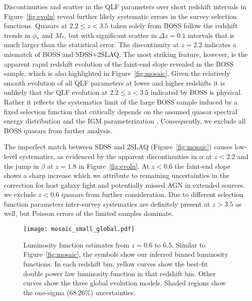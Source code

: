 \documentclass[fleqn,usenatbib]{mnras}
\begin{document}
Discontinuities and scatter in the QLF parameters over short redshift
intervals in Figure~\ref{fig:evoln} reveal further likely systematic
errors in the survey selection functions.  Quasars at $2.2\le z<3.5$
taken solely from BOSS \citep{2013ApJ...773...14R} follow the redshift
trends in $\phi_*$ and $M_*$, but with significant scatter in $\Delta
z=0.1$ intervals that is much larger than the statistical error.  The
discontinuity at $z=2.2$ indicates a mismatch of BOSS and
SDSS$+$2SLAQ. The most striking feature, however, is the apparent
rapid redshift evolution of the faint-end slope revealed in the BOSS
sample, which is also highlighted in Figure~\ref{fig:mosaic}. Given
the relatively smooth evolution of all QLF parameters at lower and
higher redshifts it is unlikely that the QLF evolution at $2.2\le
z<3.5$ indicated by BOSS is physical.  Rather it reflects the
systematics limit of the large BOSS sample induced by a fixed
selection function that critically depends on the assumed quasar
spectral energy distribution and the IGM parameterization
\citep{2011ApJ...728...23W,2013ApJ...773...14R}.  Consequently, we
exclude all BOSS quasars from further analysis.



The imperfect match between SDSS and 2SLAQ (Figure~\ref{fig:mosaic})
causes low-level systematics, as evidenced by the apparent
discontinuities in $\alpha$ at $z<2.2$ and the jump in $\beta$ at
$z=1.8$ in Figure~\ref{fig:evoln}.  At $z<0.6$ the faint-end slope
shows a sharp increase which we attribute to remaining uncertainties
in the correction for host galaxy light and potentially missed AGN in
extended sources. we exclude $z<0.6$ quasars from further
consideration. Due to different selection function parameters
inter-survey systematics are definitely present at $z>3.5$ as well,
but Poisson errors of the limited samples dominate.

\begin{figure*}
  \begin{center}
    \texttt{[image: mosaic\_small\_global.pdf]}
  \end{center}
  \caption{Luminosity function estimates from $z=0.6$ to $6.5$.
    Similar to Figure~\ref{fig:mosaic}, the symbols show our inferred
    binned luminosity functions.  In each redshift bin, yellow curves
    show the best-fit double power law luminosity function in that
    redshift bin.  Other curves show the three global evolution
    models.  Shaded regions show the one-sigma (68.26\%)
    uncertainties.}
  \label{fig:mosaic_global}
\end{figure*}
\end{document}
